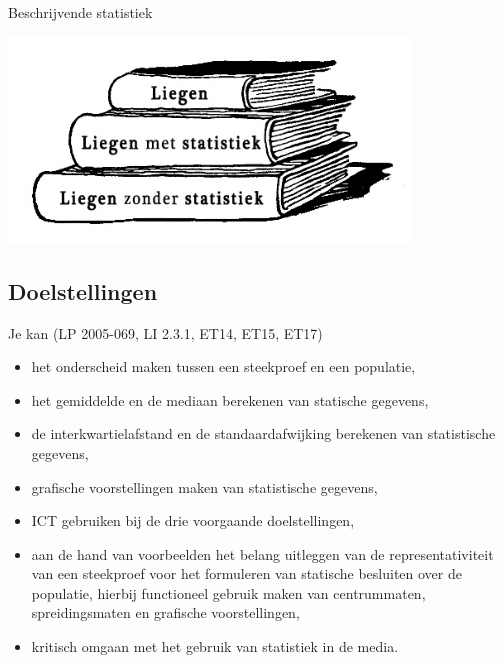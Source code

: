 \documentclass[12pt,twoside,a4paper]{article}
\begin{document}
\begin{center}
  \begin{mdframed}
  \centering
  \fontsize{40}{60}\selectfont Beschrijvende statistiek
  \end{mdframed}
  \vfill
  \includegraphics[width=0.8\textwidth]{statistiek_hoe_liegen}
  \vfill
\end{center}
\vfill
\subsection*{Doelstellingen}
\begin{singlespacing}
Je kan \hfill (LP 2005-069, LI 2.3.1, ET14, ET15, ET17)
\begin{itemize}
  \item het onderscheid maken tussen een steekproef en een populatie,
  \item het gemiddelde en de mediaan berekenen van statische gegevens,
  \item de interkwartielafstand en de standaardafwijking berekenen van statistische gegevens,
  \item grafische voorstellingen maken van statistische gegevens,
  \item ICT gebruiken bij de drie voorgaande doelstellingen,
  \item aan de hand van voorbeelden het belang uitleggen van de representativiteit van een steekproef voor het formuleren van statische besluiten over de populatie, hierbij functioneel gebruik maken van centrummaten, spreidingsmaten en grafische voorstellingen,
  \item kritisch omgaan met het gebruik van statistiek in de media.
\end{itemize}
\end{singlespacing}

\thispagestyle{empty}
\clearpage

\tableofcontents
\thispagestyle{empty}
\clearpage

\end{document}
